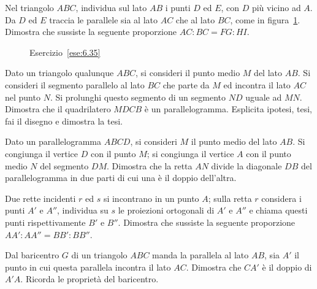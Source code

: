 \begin{esercizio}
\label{ese:6.35}
Nel triangolo $ABC$, individua sul lato $AB$ i punti $D$ ed $E$, con 
$D$ più vicino ad $A$. Da $D$ ed $E$ traccia le parallele sia al lato 
$AC$ che al lato $BC$, come in figura~\ref{fig:ese6.35}. Dimostra che 
sussiste la seguente proporzione $AC:BC=FG:HI$.
\end{esercizio}
\begin{inaccessibleblock}
 \begin{figure}[!htb]
  \centering
  \caption{Esercizio~\ref{ese:6.35}}\label{fig:ese6.35}
\end{figure}
\end{inaccessibleblock}

\begin{multicols}{2}

\begin{esercizio}
\label{ese:6.36}
Dato un triangolo qualunque $ABC$, si consideri il punto medio $M$ 
del lato $AB$. Si consideri il segmento parallelo al lato $BC$ che 
parte da $M$ ed incontra il lato $AC$ nel punto $N$. Si prolunghi 
questo segmento di un segmento $ND$ uguale ad $MN$. Dimostra che il 
quadrilatero $MDCB$ è un parallelogramma. Esplicita ipotesi, tesi, 
fai il disegno e dimostra la tesi.
\end{esercizio}

\begin{esercizio}
\label{ese:6.37}
Dato un parallelogramma $ABCD$, si consideri $M$ il punto medio del 
lato $AB$. Si congiunga il vertice $D$ con il punto $M$; si congiunga 
il vertice $A$ con il punto medio $N$ del segmento $DM$. Dimostra che 
la retta $AN$ divide la diagonale $DB$ del parallelogramma in due 
parti di cui una è il doppio dell'altra.
\end{esercizio}

\begin{esercizio}
\label{ese:6.38}
Due rette incidenti $r$ ed $s$ si incontrano in un punto $A$; sulla 
retta $r$ considera i punti $A'$ e $A''$, individua su $s$ le 
proiezioni ortogonali di $A'$ e $A''$ e chiama questi punti 
rispettivamente $B'$ e $B''$. Dimostra che sussiste la seguente 
proporzione $AA' : AA'' = BB' : BB''$.
\end{esercizio}

\begin{esercizio}
\label{ese:6.39}
Dal baricentro $G$ di un triangolo $ABC$ manda la parallela al lato 
$AB$, sia $A'$ il punto in cui questa parallela incontra il lato 
$AC$. Dimostra che $CA'$ è il doppio di $A'A$. Ricorda le proprietà 
del baricentro.
\end{esercizio}


\end{multicols}
